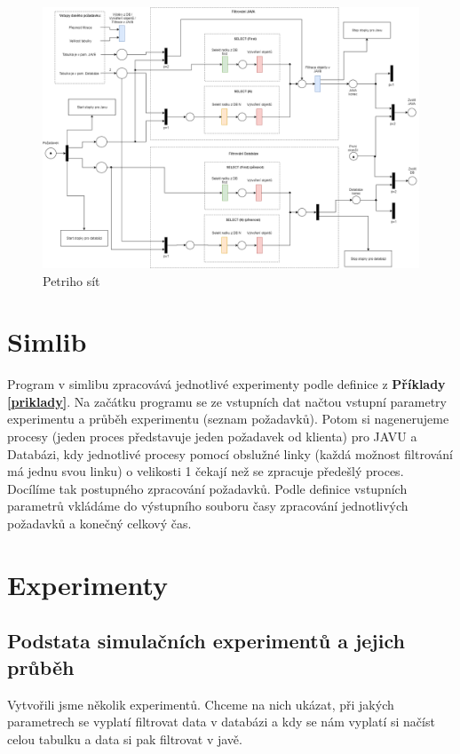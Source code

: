 \documentclass[a4paper, 11pt]{article}
\begin{document}
\newpage
\begin{figure}[H]
\centering
\includegraphics[width=220mm,  angle =90]{images/IMS-projekt.png}
\caption{Petriho sít}
\label{sec:obr7}
\end{figure}
\newpage

\section{Simlib} \label{sec:simlib}
Program v simlibu \cite{simlib_web, simlib_zdroj} zpracovává jednotlivé experimenty podle definice z \textbf{Příklady \ref{priklady}}.
Na začátku programu se ze vstupních dat načtou vstupní parametry experimentu a průběh experimentu (seznam požadavků). 
Potom si nagenerujeme procesy (jeden proces představuje jeden požadavek od klienta) pro JAVU a Databázi, kdy jednotlivé procesy pomocí obslužné linky (každá možnost filtrování má jednu svou linku) o velikosti 1 čekají než se zpracuje předešlý proces. Docílíme tak postupného zpracování požadavků. Podle definice vstupních parametrů vkládáme do výstupního souboru časy zpracování jednotlivých požadavků a konečný celkový čas.

\section{Experimenty} \label{sec:experimenty}
\subsection{Podstata simulačních experimentů a jejich průběh}
Vytvořili jsme několik experimentů. Chceme na nich ukázat, při jakých parametrech se vyplatí filtrovat data v databázi a kdy se nám vyplatí si načíst celou tabulku a data si pak filtrovat v javě.
\end{document}
